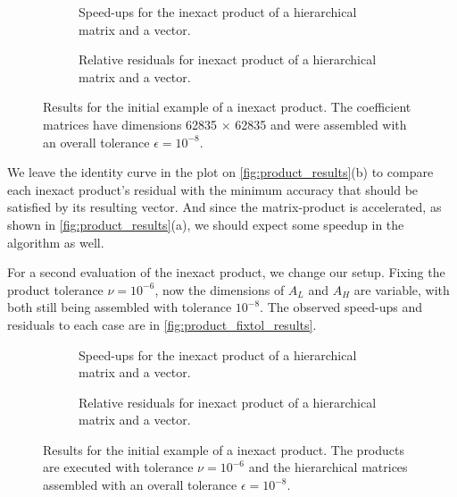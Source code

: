 \begin{figure}[h!]
    \centering
    \begin{subfigure}[b]{0.45\linewidth}
        
        \caption{Speed-ups for the inexact product of a hierarchical matrix and a vector.}
    \end{subfigure}
    \begin{subfigure}[b]{0.45\linewidth}
        
        \caption{Relative residuals for inexact product of a hierarchical matrix and a vector.}
    \end{subfigure}
    \caption{Results for the initial example of a inexact product. The coefficient matrices have dimensions 62835 $\times$ 62835 and were assembled with an overall tolerance $\epsilon = 10^{-8}$.}
    \label{fig:product_results}
\end{figure}

We leave the identity curve in the plot on \autoref{fig:product_results}(b) to compare each inexact product's residual with the minimum accuracy that should be satisfied by its resulting vector. And since the matrix-product is accelerated, as shown in \autoref{fig:product_results}(a), we should expect some speedup in the algorithm as well.

For a second evaluation of the inexact product, we change our setup. Fixing the product tolerance $\nu=10^{-6}$, now the dimensions of $A_{L}$ and $A_{H}$ are variable, with both still being assembled with tolerance $10^{-8}$. The observed speed-ups and residuals to each case are in \autoref{fig:product_fixtol_results}.

\begin{figure}[h!]
    \centering
    \begin{subfigure}[b]{0.45\linewidth}
        
        \caption{Speed-ups for the inexact product of a hierarchical matrix and a vector.}
    \end{subfigure}
    \begin{subfigure}[b]{0.45\linewidth}
        
        \caption{Relative residuals for inexact product of a hierarchical matrix and a vector.}
    \end{subfigure}
    \caption{Results for the initial example of a inexact product. The products are executed with tolerance $\nu=10^{-6}$ and the hierarchical matrices assembled with an overall tolerance $\epsilon = 10^{-8}$.}
    \label{fig:product_fixtol_results}
\end{figure}

